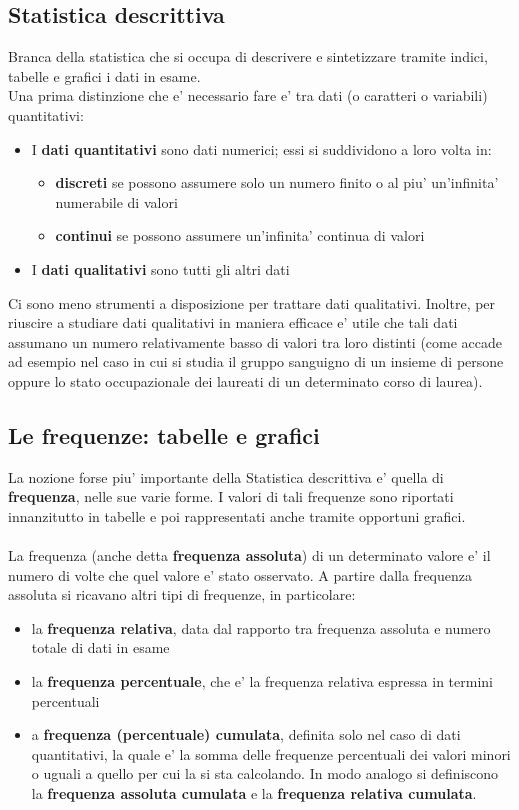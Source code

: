\documentclass[a4paper,12pt]{article}
\begin{document}
\subsection{Statistica descrittiva}
Branca della statistica che si occupa di descrivere e sintetizzare tramite indici, tabelle e grafici i dati in esame.\\
Una prima distinzione che e' necessario fare e' tra dati (o caratteri o variabili) quantitativi:
\begin{itemize}
  \item I \textbf{dati quantitativi} sono dati numerici; essi si suddividono a loro volta in:
  \begin{itemize}
    \item \textbf{discreti} se possono assumere solo un numero finito o al piu' un’infinita' numerabile di valori
    \item \textbf{continui} se possono assumere un’infinita' continua di valori
  \end{itemize}
  \item I \textbf{dati qualitativi} sono tutti gli altri dati
\end{itemize}
Ci sono meno strumenti a disposizione per trattare dati qualitativi. Inoltre, per riuscire
a studiare dati qualitativi in maniera efficace e' utile che tali dati assumano un numero
relativamente basso di valori tra loro distinti (come accade ad esempio nel caso in cui si
studia il gruppo sanguigno di un insieme di persone oppure lo stato occupazionale dei
laureati di un determinato corso di laurea).
\subsection{Le frequenze: tabelle e grafici}
La nozione forse piu' importante della Statistica descrittiva e' quella di \textbf{frequenza}, nelle
sue varie forme. I valori di tali frequenze sono riportati innanzitutto in tabelle e poi
rappresentati anche tramite opportuni grafici.\\
\vspace{1em}\\
La frequenza (anche detta \textbf{frequenza assoluta}) di un determinato valore e' il numero di volte che quel valore e' stato osservato. A partire dalla frequenza assoluta si ricavano altri tipi di frequenze, in particolare:
\begin{itemize}
  \item la \textbf{frequenza relativa}, data dal rapporto tra frequenza assoluta e numero totale di dati in esame
  \item la \textbf{frequenza percentuale}, che e' la frequenza relativa espressa in termini percentuali
  \item a \textbf{frequenza (percentuale) cumulata}, definita solo nel caso di dati quantitativi,
la quale e' la somma delle frequenze percentuali dei valori minori o uguali a quello
per cui la si sta calcolando. In modo analogo si definiscono la \textbf{frequenza assoluta cumulata} e la \textbf{frequenza relativa cumulata}.
\end{itemize}
\end{document}
